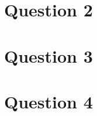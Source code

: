 \documentclass[12pt]{article}
\begin{document}
\section*{Question 2}

\section*{Question 3}

\section*{Question 4}
\end{document}
